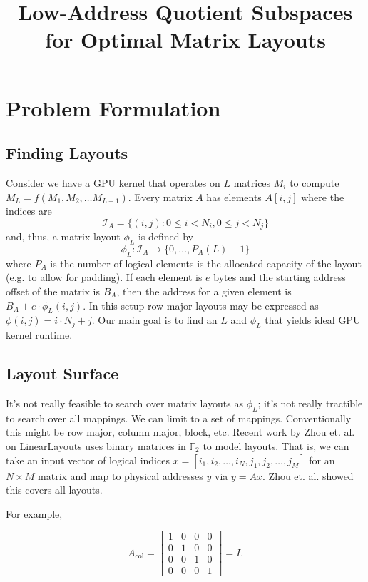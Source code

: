 \documentclass[10pt]{article}
\title{Low-Address Quotient Subspaces for Optimal Matrix Layouts}
\author{}
\date{}
\theoremstyle{remark}
\begin{document}
\maketitle
\vspace{-1.5em}

\section{Problem Formulation}

\subsection{Finding Layouts}
Consider we have a GPU kernel that operates on $L$ matrices $M_i$ to compute $M_L = f(M_1, M_2, \ldots M_{L-1})$. 
Every matrix $A$ has elements $A[i,j]$ where the indices are 
%
\[
\mathcal{I}_{A} = \{(i,j) : 0 \le i < N_i, 0  \le j < N_j\}
\]
%
and, thus, a matrix layout $\phi_L$ is defined by
\[
\phi_L : \mathcal{I}_A \rightarrow \{0, \ldots, P_A(L)-1\}
\]
where $P_A$ is the number of logical elements is the allocated capacity of the layout (e.g. to allow for padding). If each element is $e$ bytes and the starting address offset of the matrix is $B_A$, then the address for a given element is $B_A + e\cdot\phi_L(i,j)$. In this setup row major layouts may be expressed as $\phi(i,j)=i\cdot N_j + j$. Our main goal is to find an $L$ and $\phi_L$ that yields ideal GPU kernel runtime.

\subsection{Layout Surface}

It's not really feasible to search over matrix layouts as $\phi_L$; it's not really tractible to search over all mappings.
We can limit to a set of mappings. Conventionally this might be row major, column major, block, etc.
Recent work by Zhou et. al. on LinearLayouts uses binary matrices in $\mathbb{F}_2$ to model layouts.
That is, we can take an input vector of logical indices $x=[i_1,i_2,\ldots,i_N,j_1,j_2,\dots,j_M]$ for an $N\times M$ matrix and map to physical addresses $y$ via $y=Ax$.
Zhou et. al. showed this covers all layouts.

For example,

\[
A_{\text{col}} = 
\begin{bmatrix}
1&0&0&0\\
0&1&0&0\\
0&0&1&0\\
0&0&0&1
\end{bmatrix}
=I.
\]
\end{document}
